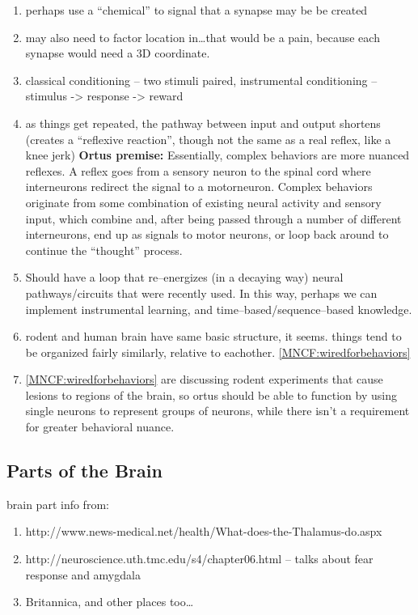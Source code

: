 \documentclass[11pt, a4paper, oneside]{article}   	%
\begin{document}
\begin{enumerate}
\item perhaps use a ``chemical'' to signal that a synapse may be be created
\item may also need to factor location in\ldots that would be a pain, because each synapse would need a 3D coordinate.
\item classical conditioning -- two stimuli paired, instrumental conditioning -- stimulus -> response -> reward
\item as things get repeated, the pathway between input and output shortens (creates a ``reflexive reaction'', though not the same as a real reflex, like a knee jerk)
  \subitem \textbf{Ortus premise:} Essentially, complex behaviors are more nuanced reflexes. A reflex goes from a sensory neuron to the spinal cord where interneurons redirect the signal to a motorneuron. Complex behaviors originate from some combination of existing neural activity and sensory input, which combine and, after being passed through a number of different interneurons, end up as signals to motor neurons, or loop back around to continue the ``thought'' process.
\item Should have a loop that re--energizes (in a decaying way) neural pathways/circuits that were recently used. In this way, perhaps we can implement instrumental learning, and time--based/sequence--based knowledge.
\item rodent and human brain have same basic structure, it seems. things tend to be organized fairly similarly, relative to eachother. \ref{MNCF:wiredforbehaviors}
\item \ref{MNCF:wiredforbehaviors} are discussing rodent experiments that cause lesions to regions of the brain, so ortus should be able to function by using single neurons to represent groups of neurons, while there isn't a requirement for greater behavioral nuance.
\end{enumerate}



\subsection{Parts of the Brain}

brain part info from:

\begin{enumerate}
    \item http://www.news-medical.net/health/What-does-the-Thalamus-do.aspx
    \item http://neuroscience.uth.tmc.edu/s4/chapter06.html -- talks about fear response and amygdala
    \item Britannica, and other places too\ldots
\end{enumerate}
\end{document}
